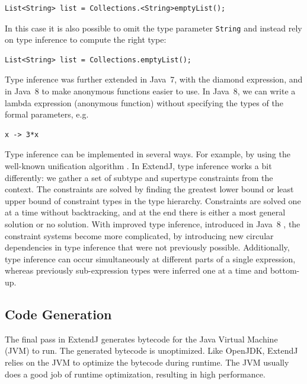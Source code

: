 \documentclass[10pt, twoside, openright]{book}
\begin{document}
\begin{lstlisting}
List<String> list = Collections.<String>emptyList();
\end{lstlisting}

\noindent
In this case it is also possible to omit the type parameter \texttt{String}
and instead rely on type inference to compute the right type:

\begin{lstlisting}
List<String> list = Collections.emptyList();
\end{lstlisting}

Type inference was further extended in Java~7, with the diamond expression,
and in Java~8 to make anonymous functions easier to use.
In Java~8, we can write a lambda expression (anonymous function) without specifying the
types of the formal parameters, e.g.

\begin{lstlisting}
x -> 3*x
\end{lstlisting}

Type inference can be implemented in several ways. For example, by using the well-known
unification algorithm \cites[p. 326]{DBLP:books/daglib/0005958}[p.
19]{moller2018static}[p. 102]{DBLP:series/utcs/Sestoft17}.  In ExtendJ, type
inference works a bit differently: we gather a set of subtype and supertype
constraints from the context.  The constraints are solved by finding the
greatest lower bound or least upper bound of constraint types in the type
hierarchy.  Constraints are solved one at a time without backtracking, and at
the end there is either a most general solution or no solution.
With improved type inference, introduced in Java~8 \cite[\S 18]{jls8},
the constraint systems become more
complicated, by introducing new circular dependencies in type inference that
were not previously possible.  Additionally, type inference can occur
simultaneously at different parts of a single expression, whereas previously sub-expression
types were inferred one at a time and bottom-up.


\subsection{Code Generation}

The final pass in ExtendJ generates bytecode for the Java Virtual Machine (JVM) to run.
The generated bytecode is unoptimized. Like OpenJDK, ExtendJ relies on the JVM to optimize the
bytecode during runtime.
The JVM usually does a good job of runtime optimization, resulting in high performance.
\end{document}
